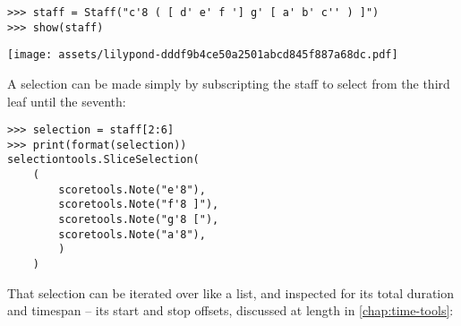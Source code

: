 \begin{comment}
<abjad>
staff = Staff("c'8 ( [ d' e' f '] g' [ a' b' c'' ) ]")
show(staff)
</abjad>
\end{comment}

\begin{abjadbookoutput}
\begin{singlespacing}
\vspace{-0.5\baselineskip}
\begin{verbatim}
>>> staff = Staff("c'8 ( [ d' e' f '] g' [ a' b' c'' ) ]")
>>> show(staff)
\end{verbatim}
\noindent\texttt{[image: assets/lilypond-dddf9b4ce50a2501abcd845f887a68dc.pdf]}
\end{singlespacing}
\end{abjadbookoutput}

\noindent A selection can be made simply by subscripting the staff to select
from the third leaf until the seventh:

\begin{comment}
<abjad>
selection = staff[2:6]
print(format(selection))
</abjad>
\end{comment}

\begin{abjadbookoutput}
\begin{singlespacing}
\vspace{-0.5\baselineskip}
\begin{verbatim}
>>> selection = staff[2:6]
>>> print(format(selection))
selectiontools.SliceSelection(
    (
        scoretools.Note("e'8"),
        scoretools.Note("f'8 ]"),
        scoretools.Note("g'8 ["),
        scoretools.Note("a'8"),
        )
    )
\end{verbatim}
\end{singlespacing}
\end{abjadbookoutput}

\noindent That selection can be iterated over like a list, and inspected for
its total duration and timespan -- its start and stop offsets, discussed at
length in \autoref{chap:time-tools}:

\begin{comment}
<abjad>
for component in selection:
    component

selection.get_duration()
selection.get_timespan()
</abjad>
\end{comment}

